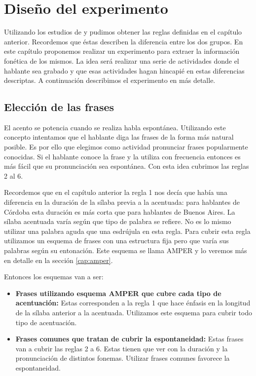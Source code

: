 \chapter{Diseño del experimento}

Utilizando los estudios de \cite{Fontanella2000} y  \cite{Vidal1964} pudimos obtener las reglas definidas en el capítulo anterior. Recordemos que éstas describen la diferencia entre los dos grupos. En este capítulo proponemos realizar un experimento para extraer la información fonética de los mismos. La idea será realizar una serie de actividades donde el hablante sea grabado y que esas actividades hagan hincapié en estas diferencias descriptas. A continuación describimos el experimento en más detalle.

\section{Elección de las frases}

El acento se potencia cuando se realiza habla espontánea. Utilizando este concepto intentamos que el hablante diga las frases de la forma más natural posible. Es por ello que elegimos como actividad pronunciar frases popularmente conocidas. Si el hablante conoce la frase y la utiliza con frecuencia entonces es más fácil que su pronunciación sea espontánea. Con esta idea cubrimos las reglas 2 al 6. 

Recordemos que en el capítulo anterior la regla 1 nos decía que había una diferencia en la duración de la sílaba previa a la acentuada: para hablantes de Córdoba esta duración es más corta que para hablantes de Buenos Aires. La sílaba acentuada varía según que tipo de palabra se refiere. No es lo mismo utilizar una palabra aguda que una esdrújula en esta regla. Para cubrir esta regla utilizamos un esquema de frases con una estructura fija pero que varía sus palabras según su entonación. Este esquema se llama AMPER \cite{amper2004,amper} y lo veremos más en detalle en la sección \ref{cap:amper}.

Entonces los esquemas van a ser: 

\begin{itemize}
  \item \textbf{Frases utilizando esquema AMPER que cubre cada tipo de acentuación:} Estas corresponden a la regla 1 que hace énfasis en la longitud de la sílaba anterior a la acentuada. Utilizamos este esquema para cubrir todo tipo de acentuación.
  \item \textbf{Frases comunes que tratan de cubrir la espontaneidad:} Estas frases van a cubrir las reglas 2 a 6. Estas tienen que ver con la duración y la pronunciación de distintos fonemas. Utilizar frases comunes favorece la espontaneidad.
\end{itemize}

